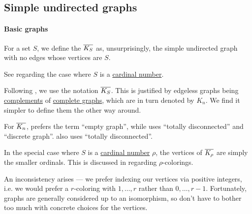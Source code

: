 \subsection{Simple undirected graphs}\label{subsec:simple_undirected_graphs}

\paragraph{Basic graphs}

\begin{definition}\label{def:edgeless_graph}\mimprovised
  For a set \( S \), we define the  \( \oline{K_S} \) as, unsurprisingly, the simple undirected graph with no edges whose vertices are \( S \).
\end{definition}
\begin{comments}
  \item See  regarding the case where \( S \) is a \hyperref[def:cardinal]{cardinal number}.

  \item Following , we use the notation \( \oline{K_S} \). This is justified by edgeless graphs being \hyperref[def:graph_complement]{complements} of \hyperref[def:complete_graph]{complete graphs}, which are in turn denoted by \( K_n \). We find it simpler to define them the other way around.

  \item For \( \oline{K_n} \),  prefers the term \enquote{empty graph}, while  uses \enquote{totally disconnected} and \enquote{discrete graph}.  also uses \enquote{totally disconnected}.
\end{comments}

\begin{remark}\label{rem:universal_graph_cardinals}
  In the special case where \( S \) is a \hyperref[def:cardinal]{cardinal number} \( \rho \), the vertices of \( \oline{K_\rho} \) are simply the smaller ordinals. This is discussed in  regarding \( \rho \)-colorings.

  An inconsistency arises --- we prefer indexing our vertices via positive integers, i.e. we would prefer a \( r \)-coloring with \( 1, \ldots, r \) rather than \( 0, \ldots, r - 1 \). Fortunately, graphs are generally considered up to an isomorphism, so don't have to bother too much with concrete choices for the vertices.
\end{remark}

